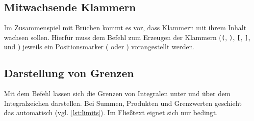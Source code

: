 \begin{table}[H]
\end{table}

\subsection{Mitwachsende Klammern}

Im Zusammenspiel mit Brüchen kommt es vor, dass Klammern mit ihrem Inhalt wachsen sollen.
Hierfür muss dem Befehl zum Erzeugen der Klammern (\texttt{(}, \texttt{)}, \texttt{[}, \texttt{]}, \texttt{\lbrace} und \texttt{\rbrace}) jeweils ein Positionsmarker (\texttt{\left} oder \texttt{\right}) vorangestellt werden.


\subsection{Darstellung von Grenzen}

Mit dem Befehl \texttt{\limits} lassen sich die Grenzen von Integralen unter und über dem Integralzeichen darstellen.
Bei Summen, Produkten und Grenzwerten geschieht das automatisch (vgl. \cref{lst:limits}).
Im Fließtext eignet sich \texttt{\limits} nur bedingt.

